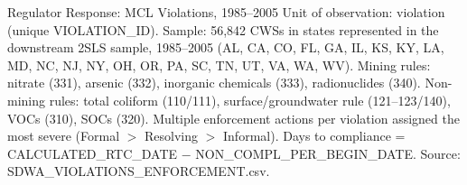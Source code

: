 \begin{frame}{Regulator Response: MCL Violations, 1985--2005}
\label{tab:reg_response_mcl}
{\tiny Unit of observation: violation (unique VIOLATION\_ID). Sample: 56,842 CWSs in states represented in the downstream 2SLS sample, 1985--2005 (AL, CA, CO, FL, GA, IL, KS, KY, LA, MD, NC, NJ, NY, OH, OR, PA, SC, TN, UT, VA, WA, WV). Mining rules: nitrate (331), arsenic (332), inorganic chemicals (333), radionuclides (340). Non-mining rules: total coliform (110/111), surface/groundwater rule (121--123/140), VOCs (310), SOCs (320). Multiple enforcement actions per violation assigned the most severe (Formal $>$ Resolving $>$ Informal). Days to compliance = CALCULATED\_RTC\_DATE $-$ NON\_COMPL\_PER\_BEGIN\_DATE. Source: SDWA\_VIOLATIONS\_ENFORCEMENT.csv.}
\end{frame}
